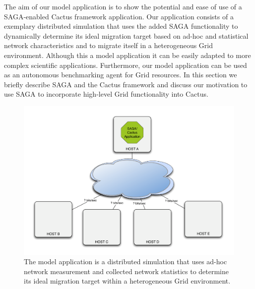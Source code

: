 \documentclass[conference,final]{IEEEtran}
\begin{document}
The aim of our model application is to show the potential and ease of
use of a SAGA-enabled Cactus framework application. Our application
consists of a exemplary distributed simulation that uses the added
SAGA functionality to dynamically determine its ideal migration target
based on ad-hoc and statistical network characteristics and to migrate
itself in a heterogeneous Grid environment.  Although this a model
application it can be easily adapted to more complex scientific
applications.  Furthermore, our model application can be used as an
autonomous benchmarking agent for Grid resources. In this section we
briefly describe SAGA and the Cactus framework and discuss our
motivation to use SAGA to incorporate high-level Grid functionality
into Cactus.


\begin{figure}
\begin{center}
\includegraphics[scale=0.30]{./figures/figure_00}
\end{center}
\caption{The model application is a distributed simulation that uses ad-hoc network measurement and collected network statistics to determine its ideal migration target within a heterogeneous Grid environment. }
\label{fig:model}
\end{figure}
\end{document}
